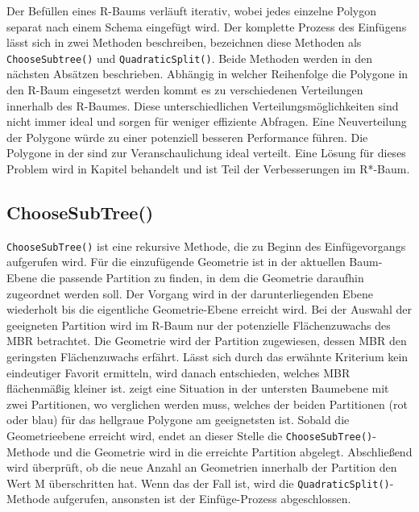 \documentclass[runningheads,a4paper]{llncs}
\begin{document}
	Der Befüllen eines R-Baums verläuft iterativ, wobei jedes einzelne Polygon separat nach einem Schema eingefügt wird. Der komplette Prozess des Einfügens lässt sich in zwei Methoden beschreiben, \Textcite{Beckmann:1990} bezeichnen diese Methoden als \texttt{ChooseSubtree()} und \texttt{QuadraticSplit()}. Beide Methoden werden in den nächsten Absätzen beschrieben. Abhängig in welcher Reihenfolge die Polygone in den R-Baum eingesetzt werden kommt es zu verschiedenen Verteilungen innerhalb des R-Baumes. Diese unterschiedlichen Verteilungsmöglichkeiten sind nicht immer ideal und sorgen für weniger effiziente Abfragen. Eine Neuverteilung der Polygone würde zu einer potenziell besseren Performance führen. Die Polygone in der  sind zur Veranschaulichung ideal verteilt. Eine Lösung für dieses Problem wird in Kapitel  behandelt und ist Teil der Verbesserungen im R*-Baum.

	\subsection{ChooseSubTree()}
	\label{sec:r-choose-sub}
	\texttt{ChooseSubTree()} ist eine rekursive Methode, die zu Beginn des Einfügevorgangs aufgerufen wird. Für die einzufügende Geometrie ist in der aktuellen Baum-Ebene die passende Partition zu finden, in dem die Geometrie daraufhin zugeordnet werden soll. Der Vorgang wird in der darunterliegenden Ebene wiederholt bis die eigentliche Geometrie-Ebene erreicht wird. Bei der Auswahl der geeigneten Partition wird im R-Baum nur der potenzielle Flächenzuwachs des \acs{MBR} betrachtet. Die Geometrie wird der Partition zugewiesen, dessen \acs{MBR} den geringsten Flächenzuwachs erfährt. Lässt sich durch das erwähnte Kriterium kein eindeutiger Favorit ermitteln, wird danach entschieden, welches \acs{MBR} flächenmäßig kleiner ist.  zeigt eine Situation in der untersten Baumebene mit zwei Partitionen, wo verglichen werden muss, welches der beiden Partitionen (rot oder blau) für das hellgraue Polygone am geeignetsten ist. Sobald die Geometrieebene erreicht wird, endet an dieser Stelle die \texttt{ChooseSubTree()}-Methode und die Geometrie wird in die erreichte Partition abgelegt. Abschließend wird überprüft, ob die neue Anzahl an Geometrien innerhalb der Partition den Wert \acs{M} überschritten hat. Wenn das der Fall ist, wird die \texttt{QuadraticSplit()}-Methode aufgerufen, ansonsten ist der Einfüge-Prozess abgeschlossen.
\end{document}
